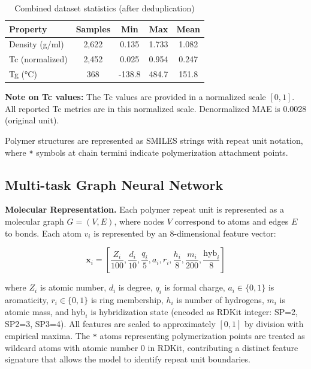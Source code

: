 \documentclass{article}
\begin{document}
\begin{table}[h]
\centering
\caption{Combined dataset statistics (after deduplication)}
\label{tab:dataset}
\begin{tabular}{lcccc}
\toprule
Property & Samples & Min & Max & Mean \\
\midrule
Density (g/ml) & 2,622 & 0.135 & 1.733 & 1.082 \\
Tc (normalized) & 2,452 & 0.025 & 0.954 & 0.247 \\
Tg (°C)        &   368 & -138.8 & 484.7 & 151.8 \\
\bottomrule
\end{tabular}
\end{table}

\noindent\textbf{Note on Tc values:} The Tc values are provided in a normalized
scale $[0, 1]$. All reported Tc metrics are in this normalized scale.
Denormalized MAE is 0.0028 (original unit).

Polymer structures are represented as SMILES strings with repeat unit notation,
where \texttt{*} symbols at chain termini indicate polymerization attachment points.

\subsection{Multi-task Graph Neural Network}

\noindent\textbf{Molecular Representation.}
Each polymer repeat unit is represented as a molecular graph $G = (V, E)$,
where nodes $V$ correspond to atoms and edges $E$ to bonds.
Each atom $v_i$ is represented by an 8-dimensional feature vector:

\begin{equation}
\mathbf{x}_i = [\frac{Z_i}{100}, \frac{d_i}{10}, \frac{q_i}{5},
a_i, r_i, \frac{h_i}{8}, \frac{m_i}{200}, \frac{\text{hyb}_i}{8}]
\end{equation}

where $Z_i$ is atomic number, $d_i$ is degree, $q_i$ is formal charge,
$a_i \in \{0,1\}$ is aromaticity, $r_i \in \{0,1\}$ is ring membership,
$h_i$ is number of hydrogens, $m_i$ is atomic mass, and
$\text{hyb}_i$ is hybridization state (encoded as RDKit integer: SP=2, SP2=3, SP3=4).
All features are scaled to approximately $[0, 1]$ by division with empirical maxima.
The \texttt{*} atoms representing polymerization points are treated as
wildcard atoms with atomic number 0 in RDKit, contributing a distinct
feature signature that allows the model to identify repeat unit boundaries.
\end{document}
